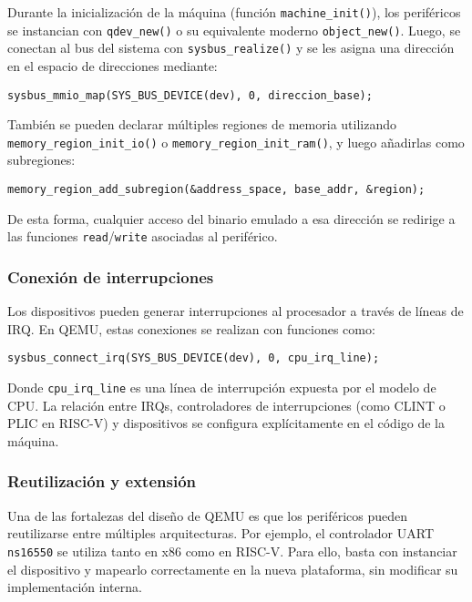 Durante la inicialización de la máquina (función \texttt{machine\_init()}), los periféricos se instancian con \texttt{qdev\_new()} o su equivalente moderno \texttt{object\_new()}. Luego, se conectan al bus del sistema con \texttt{sysbus\_realize()} y se les asigna una dirección en el espacio de direcciones mediante:

\begin{verbatim}
sysbus_mmio_map(SYS_BUS_DEVICE(dev), 0, direccion_base);
\end{verbatim}

También se pueden declarar múltiples regiones de memoria utilizando \texttt{memory\_region\_init\_io()} o \texttt{memory\_region\_init\_ram()}, y luego añadirlas como subregiones:

\begin{verbatim}
memory_region_add_subregion(&address_space, base_addr, &region);
\end{verbatim}

De esta forma, cualquier acceso del binario emulado a esa dirección se redirige a las funciones \texttt{read}/\texttt{write} asociadas al periférico.

\subsubsection*{Conexión de interrupciones}

Los dispositivos pueden generar interrupciones al procesador a través de líneas de IRQ. En QEMU, estas conexiones se realizan con funciones como:

\begin{verbatim}
sysbus_connect_irq(SYS_BUS_DEVICE(dev), 0, cpu_irq_line);
\end{verbatim}

Donde \texttt{cpu\_irq\_line} es una línea de interrupción expuesta por el modelo de CPU. La relación entre IRQs, controladores de interrupciones (como CLINT o PLIC en RISC-V) y dispositivos se configura explícitamente en el código de la máquina.

\subsubsection*{Reutilización y extensión}

Una de las fortalezas del diseño de QEMU es que los periféricos pueden reutilizarse entre múltiples arquitecturas. Por ejemplo, el controlador UART \texttt{ns16550} se utiliza tanto en x86 como en RISC-V. Para ello, basta con instanciar el dispositivo y mapearlo correctamente en la nueva plataforma, sin modificar su implementación interna.

